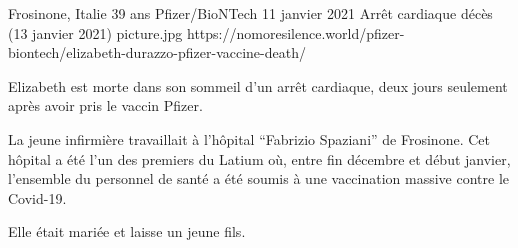 {Frosinone, Italie}
{39 ans}
{Pfizer/BioNTech}
{11 janvier 2021}
{Arrêt cardiaque décès (13 janvier 2021)}
{picture.jpg}
{https://nomoresilence.world/pfizer-biontech/elizabeth-durazzo-pfizer-vaccine-death/}
{

Elizabeth est morte dans son sommeil d'un arrêt cardiaque, deux jours seulement
après avoir pris le vaccin Pfizer.

La jeune infirmière travaillait à l'hôpital “Fabrizio Spaziani” de
Frosinone. Cet hôpital a été l'un des premiers du Latium où, entre fin décembre
et début janvier, l'ensemble du personnel de santé a été soumis à une
vaccination massive contre le Covid-19.

Elle était mariée et laisse un jeune fils.

}
